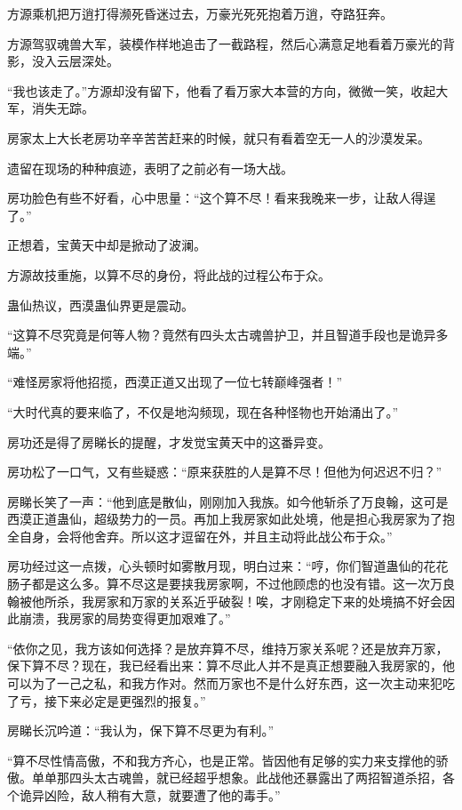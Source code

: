 \begin{this_body}
方源乘机把万逍打得濒死昏迷过去，万豪光死死抱着万逍，夺路狂奔。

方源驾驭魂兽大军，装模作样地追击了一截路程，然后心满意足地看着万豪光的背影，没入云层深处。

“我也该走了。”方源却没有留下，他看了看万家大本营的方向，微微一笑，收起大军，消失无踪。

房家太上大长老房功辛辛苦苦赶来的时候，就只有看着空无一人的沙漠发呆。

遗留在现场的种种痕迹，表明了之前必有一场大战。

房功脸色有些不好看，心中思量：“这个算不尽！看来我晚来一步，让敌人得逞了。”

正想着，宝黄天中却是掀动了波澜。

方源故技重施，以算不尽的身份，将此战的过程公布于众。

蛊仙热议，西漠蛊仙界更是震动。

“这算不尽究竟是何等人物？竟然有四头太古魂兽护卫，并且智道手段也是诡异多端。”

“难怪房家将他招揽，西漠正道又出现了一位七转巅峰强者！”

“大时代真的要来临了，不仅是地沟频现，现在各种怪物也开始涌出了。”

房功还是得了房睇长的提醒，才发觉宝黄天中的这番异变。

房功松了一口气，又有些疑惑：“原来获胜的人是算不尽！但他为何迟迟不归？”

房睇长笑了一声：“他到底是散仙，刚刚加入我族。如今他斩杀了万良翰，这可是西漠正道蛊仙，超级势力的一员。再加上我房家如此处境，他是担心我房家为了抱全自身，会将他舍弃。所以这才逗留在外，并且主动将此战公布于众。”

房功经过这一点拨，心头顿时如雾散月现，明白过来：“哼，你们智道蛊仙的花花肠子都是这么多。算不尽这是要挟我房家啊，不过他顾虑的也没有错。这一次万良翰被他所杀，我房家和万家的关系近乎破裂！唉，才刚稳定下来的处境搞不好会因此崩溃，我房家的局势变得更加艰难了。”

“依你之见，我方该如何选择？是放弃算不尽，维持万家关系呢？还是放弃万家，保下算不尽？现在，我已经看出来：算不尽此人并不是真正想要融入我房家的，他可以为了一己之私，和我方作对。然而万家也不是什么好东西，这一次主动来犯吃了亏，接下来必定是更强烈的报复。”

房睇长沉吟道：“我认为，保下算不尽更为有利。”

“算不尽性情高傲，不和我方齐心，也是正常。皆因他有足够的实力来支撑他的骄傲。单单那四头太古魂兽，就已经超乎想象。此战他还暴露出了两招智道杀招，各个诡异凶险，敌人稍有大意，就要遭了他的毒手。”


\end{this_body}
